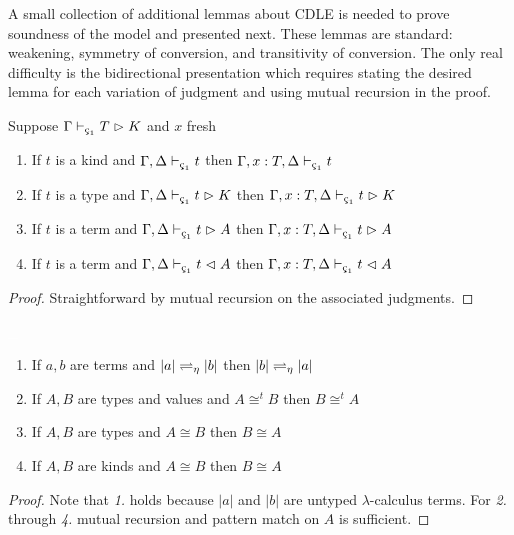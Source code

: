 A small collection of additional lemmas about CDLE is needed to prove soundness of the model and presented next.
These lemmas are standard: weakening, symmetry of conversion, and transitivity of conversion.
The only real difficulty is the bidirectional presentation which requires stating the desired lemma for each variation of judgment and using mutual recursion in the proof.

\begin{lemma}
    \label{lem:4:c1_weakening}
    Suppose $\Gamma \vdash_{\oldced} T \infr K$ and $x$ fresh
    \begin{enumerate}
        \item If $t$ is a kind and $\Gamma, \Delta \vdash_{\oldced} t$ then $\Gamma, x : T, \Delta \vdash_{\oldced} t$
        \item If $t$ is a type and $\Gamma, \Delta \vdash_{\oldced} t \infr K$ then $\Gamma, x : T, \Delta \vdash_{\oldced} t \infr K$
        \item If $t$ is a term and $\Gamma, \Delta \vdash_{\oldced} t \infr A$ then $\Gamma, x : T, \Delta \vdash_{\oldced} t \infr A$
        \item If $t$ is a term and $\Gamma, \Delta \vdash_{\oldced} t \chck A$ then $\Gamma, x : T, \Delta \vdash_{\oldced} t \chck A$
    \end{enumerate}
\end{lemma}
\begin{proof}
    Straightforward by mutual recursion on the associated judgments.
\end{proof}

\begin{lemma}
    \label{lem:4:c1_sym}
    \textcolor{white}{\_}
    \begin{enumerate}
        \item If $a, b$ are terms and $|a| \rightleftharpoons_\eta |b|$ then $|b| \rightleftharpoons_\eta |a|$
        \item If $A, B$ are types and values and $A \cong^t B$ then $B \cong^t A$
        \item If $A, B$ are types and $A \cong B$ then $B \cong A$
        \item If $A, B$ are kinds and $A \cong B$ then $B \cong A$
    \end{enumerate}
\end{lemma}
\begin{proof}
    Note that \textit{1.} holds because $|a|$ and $|b|$ are untyped $\lambda$-calculus terms.
    For \textit{2.} through \textit{4.} mutual recursion and pattern match on $A$ is sufficient.
\end{proof}

